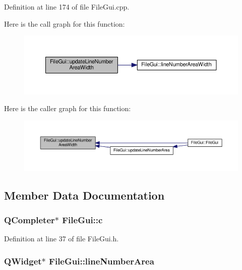 Definition at line 174 of file File\-Gui.\-cpp.



Here is the call graph for this function\-:
\nopagebreak
\begin{figure}[H]
\begin{center}
\leavevmode
\includegraphics[width=350pt]{class_file_gui_a498aa60814cc9265695e656e9b7a2e87_cgraph}
\end{center}
\end{figure}




Here is the caller graph for this function\-:
\nopagebreak
\begin{figure}[H]
\begin{center}
\leavevmode
\includegraphics[width=350pt]{class_file_gui_a498aa60814cc9265695e656e9b7a2e87_icgraph}
\end{center}
\end{figure}




\subsection{Member Data Documentation}
\hypertarget{class_file_gui_a71dfac2e67bf84af494667901b51ddc9}{
\subsubsection[{c}]{\setlength{\rightskip}{0pt plus 5cm}Q\-Completer$\ast$ File\-Gui\-::c\hspace{0.3cm}{\ttfamily [private]}}}\label{class_file_gui_a71dfac2e67bf84af494667901b51ddc9}


Definition at line 37 of file File\-Gui.\-h.

\hypertarget{class_file_gui_a4fa030b7bda34eeb961eac7324f28b88}{
\subsubsection[{line\-Number\-Area}]{\setlength{\rightskip}{0pt plus 5cm}Q\-Widget$\ast$ File\-Gui\-::line\-Number\-Area\hspace{0.3cm}{\ttfamily [private]}}}\label{class_file_gui_a4fa030b7bda34eeb961eac7324f28b88}



